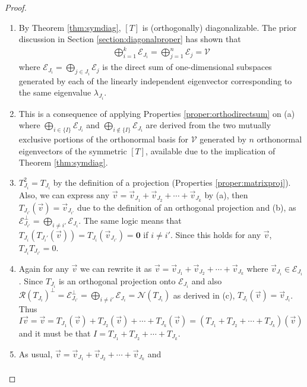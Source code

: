 \begin{proof}
\begin{enumerate}[label=(\alph*)]  
\item By Theorem \ref{thm:symdiag}, $[T]$ is (orthogonally) diagonalizable. The prior discussion in Section \ref{section:diagonalproper} has shown that
\begin{align*}
\bigoplus_{i=1}^{k} \mathcal{E}_{J_i} = \bigoplus_{j=1}^n \mathcal{E}_j = \mathcal{V}  
\end{align*}
where $\mathcal{E}_{J_i} = \bigoplus_{j \in J_i} \mathcal{E}_j$ is the direct sum of one-dimensional subspaces generated by each of the linearly independent eigenvector corresponding to the same eigenvalue $\lambda_{J_i}$.
\item This is a consequence of applying Properties \ref{proper:orthodirectsum} on (a) where $\bigoplus_{i \in \{I\}} \mathcal{E}_{J_i}$ and $\bigoplus_{i \notin \{I\}} \mathcal{E}_{J_i}$ are derived from the two mutually exclusive portions of the orthonormal basis for $\mathcal{V}$ generated by $n$ orthonormal eigenvectors of the symmetric $[T]$, available due to the implication of Theorem \ref{thm:symdiag}.
\item $T_{J_i}^2 = T_{J_i}$ by the definition of a projection (Properties \ref{proper:matrixproj}). Also, we can express any $\vec{v} = \vec{v}_{J_1} + \vec{v}_{J_2} + \cdots + \vec{v}_{J_k}$ by (a), then $T_{J_{i'}}(\vec{v}) = \vec{v}_{J_{i'}}$ due to the definition of an orthogonal projection and (b), as $\mathcal{E}_{J_{i'}}^\perp = \bigoplus_{i \neq i'} \mathcal{E}_{J_i}$. The same logic means that $T_{J_i}(T_{J_i'}(\vec{v})) = T_{J_i}(\vec{v}_{J_{i'}}) = \textbf{0}$ if $i \neq i'$. Since this holds for any $\vec{v}$, $T_{J_i} T_{J_{i'}} = 0$.
\item Again for any $\vec{v}$ we can rewrite it as $\vec{v} = \vec{v}_{J_1} + \vec{v}_{J_2} + \cdots + \vec{v}_{J_k}$ where $\vec{v}_{J_i} \in \mathcal{E}_{J_i}$. Since $T_{J_i}$ is an orthogonal projection onto $\mathcal{E}_{J_i}$ and also $\mathcal{R}(T_{J_i})^\perp = \mathcal{E}_{J_{i'}}^\perp = \bigoplus_{i \neq i'} \mathcal{E}_{J_i} = \mathcal{N}(T_{J_i})$ as derived in (c), $T_{J_i}(\vec{v}) = \vec{v}_{J_i}$. Thus $I\vec{v} = \vec{v} = T_{J_1}(\vec{v}) + T_{J_2}(\vec{v}) + \cdots + T_{J_k}(\vec{v}) = (T_{J_1} + T_{J_2} + \cdots + T_{J_k})(\vec{v})$ and it must be that $I = T_{J_1} + T_{J_2} + \cdots + T_{J_k}$.
\item As usual, $\vec{v} = \vec{v}_{J_1} + \vec{v}_{J_2} + \cdots + \vec{v}_{J_k}$ and
\begin{align*}

\end{align*}
\end{enumerate}
\end{proof}
